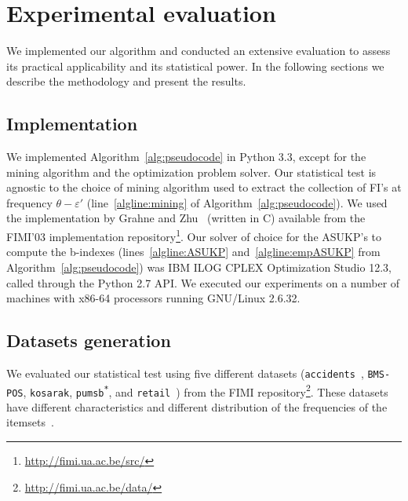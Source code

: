 
\section{Experimental evaluation}\label{sec:experiments}
We implemented our algorithm and conducted an extensive evaluation to assess its
practical applicability and its statistical power. In the following sections we
describe the methodology and present the results.

\subsection{Implementation}\label{sec:implementation}
We implemented Algorithm~\ref{alg:pseudocode} in Python 3.3, except for the
mining algorithm and the optimization problem solver. Our statistical test is
agnostic to the choice of mining algorithm used to extract the collection of
FI's at frequency $\theta-\varepsilon'$ (line~\ref{algline:mining} of
Algorithm~\ref{alg:pseudocode}). We used the implementation by Grahne and
Zhu~\citep{GrahneZ03} (written in C) available from the FIMI'03 implementation
repository\footnote{\url{http://fimi.ua.ac.be/src/}}. Our solver of choice for
the ASUKP's to compute the b-indexes (lines~\ref{algline:ASUKP} and~\ref{algline:empASUKP} from Algorithm~\ref{alg:pseudocode}) was
IBM\textsuperscript{\textregistered} ILOG\textsuperscript{\textregistered}
CPLEX\textsuperscript{\textregistered} Optimization Studio 12.3, called through
the Python 2.7 API. We executed our experiments on a number of machines with
x86-64 processors running GNU/Linux 2.6.32.

\subsection{Datasets generation}\label{sec:dsgen}
\sloppy
We evaluated our statistical test using five different datasets
(\texttt{accidents}~\citep{GeurtsWBV03}, \texttt{BMS-POS}, \texttt{kosarak},
\texttt{pumsb\textsuperscript{*}}, and \texttt{retail}~\citep{BrijsSVW99}) from the FIMI
repository\footnote{\url{http://fimi.ua.ac.be/data/}}. These datasets have
different characteristics and different distribution of the frequencies of the
itemsets~\cite{Goethals:2004:AFI:1007730.1007744}.

